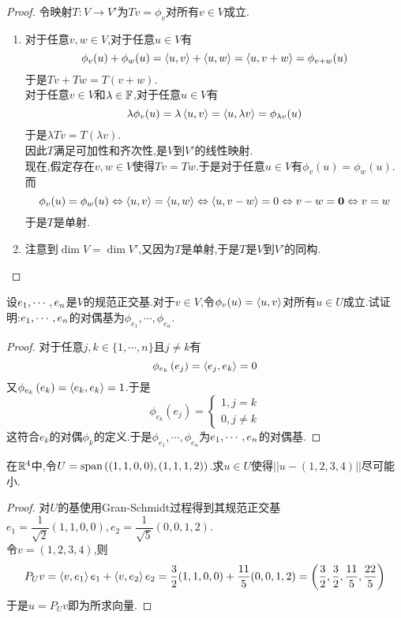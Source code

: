 \documentclass{ctexart}
\begin{document}
\begin{proof}
    令映射$T:V\to V'$为$Tv=\phi_v$对所有$v\in V$成立.
    \begin{enumerate}[label=\tbf{(\arabic*)}]
        \item 对于任意$v,w\in V$,对于任意$u\in V$有
            \[\phi_v(u)+\phi_w(u)=\left\langle{u},{v}\right\rangle+\left\langle{u},{w}\right\rangle=\left\langle{u},{v+w}\right\rangle=\phi_{v+w}(u)\]
            于是$Tv+Tw=T(v+w)$.\\
            对于任意$v\in V$和$\lambda\in\mathbb{F}$,对于任意$u\in V$有
            \[\lambda\phi_v(u)=\lambda\left\langle{u},{v}\right\rangle=\left\langle{u},{\lambda v}\right\rangle=\phi_{\lambda v}(u)\]
            于是$\lambda Tv=T\left(\lambda v\right)$.\\
            因此$T$满足可加性和齐次性,是$V$到$V'$的线性映射.\\
            现在,假定存在$v,w\in V$使得$Tv=Tw$.于是对于任意$u\in V$有$\phi_v(u)=\phi_w(u)$.而
            \[\phi_v(u)=\phi_w(u)\Leftrightarrow \left\langle{u},{v}\right\rangle=\left\langle{u},{w}\right\rangle\Leftrightarrow \left\langle{u},{v-w}\right\rangle=0\Leftrightarrow v-w=\mathbf0\Leftrightarrow v=w\]
            于是$T$是单射.
        \item 注意到$\dim V=\dim V'$,又因为$T$是单射,于是$T$是$V$到$V'$的同构.
    \end{enumerate}
\end{proof}
\begin{problem}[14.]
    设${e}_1,\cdots,{e}_{n}$是$V$的规范正交基.对于$v\in V$,令$\phi_v(u)=\left\langle{u},{v}\right\rangle$对所有$u\in U$成立.试证明:${e}_1,\cdots,{e}_{n}$的对偶基为$\phi_{e_1},\cdots,\phi_{e_n}$.
\end{problem}
\begin{proof}
    对于任意$j,k\in\{1,\cdots,n\}$且$j\neq k$有
    \[\phi_{e_k}\left(e_j\right)=\left\langle{e_j},{e_k}\right\rangle=0\]
    又$\phi_{e_k}\left(e_k\right)=\left\langle{e_k},{e_k}\right\rangle=1$.于是
    \[\phi_{e_k}\left(e_j\right)=\left\{\begin{array}{l}
        1,j=k\\0,j\neq k
    \end{array}\right.\]
    这符合$e_k$的对偶$\phi_k$的定义.于是$\phi_{e_1},\cdots,\phi_{e_n}$为${e}_1,\cdots,{e}_{n}$的对偶基.
\end{proof}
\begin{problem}[15.]
    在$\mathbb{R}^4$中,令$U=\text{span}\left((1,1,0,0),(1,1,1,2)\right)$.求$u\in U$使得$||u-(1,2,3,4)||$尽可能小.
\end{problem}
\begin{proof}
    对$U$的基使用Gran-Schmidt过程得到其规范正交基$e_1=\dfrac{1}{\sqrt{2}}(1,1,0,0),e_2=\dfrac{1}{\sqrt{5}}(0,0,1,2)$.\\
    令$v=(1,2,3,4)$,则
    \[P_Uv=\left\langle{v},{e_1}\right\rangle e_1+\left\langle{v},{e_2}\right\rangle e_2=\dfrac{3}{2}(1,1,0,0)+\dfrac{11}{5}(0,0,1,2)=\left(\dfrac32,\dfrac32,\dfrac{11}{5},\dfrac{22}{5}\right)\]
    于是$u=P_Uv$即为所求向量.
\end{proof}
\end{document}
